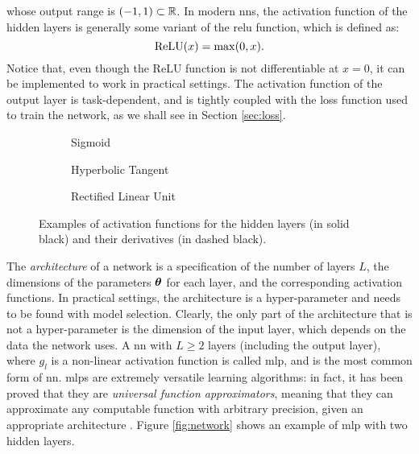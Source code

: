 whose output range is $(-1, 1) \subset \mathbb{R}$. In modern \glspl{nn}, the activation function of the hidden layers is generally some variant of the \gls{relu} function, which is defined as:
$$\mathrm{ReLU}(x) = \max(0, x).$$
Notice that, even though the ReLU function is not differentiable at $x = 0$, it can be implemented to work in practical settings.
The activation function of the output layer is task-dependent, and is tightly
coupled with the loss function used to train the network, as we shall see in
Section \ref{sec:loss}.
\begin{figure*}[h!]
    \begin{subfigure}[b]{0.32\linewidth}
        \centering
        \resizebox{.8\textwidth}{!}{}
        \caption{Sigmoid}
        \label{fig:sigmoid}
    \end{subfigure}
    \begin{subfigure}[b]{0.32\linewidth}
        \centering
        \resizebox{.8\textwidth}{!}{}
        \caption{Hyperbolic Tangent}
        \label{fig:hyptan}
    \end{subfigure}
    \begin{subfigure}[b]{0.32\linewidth}
        \centering
        \resizebox{.8\textwidth}{!}{}
        \caption{Rectified Linear Unit}
        \label{fig:relu}
    \end{subfigure}
    \caption{Examples of activation functions for the hidden layers (in solid black) and their derivatives (in dashed black).}
    \label{fig:activations}
\end{figure*}
The \emph{architecture} of a network is a specification of the number of layers
$L$, the dimensions of the parameters $\boldsymbol{\theta}$ for each layer, and the
corresponding activation functions. In practical settings, the architecture is a hyper-parameter and needs to be found with model selection. Clearly, the only part of the architecture that is not a hyper-parameter is the dimension of the input layer, which depends on the data the network uses. A \gls{nn} with $L \geq 2$ layers (including the output layer), where $g_{l}$ is a non-linear activation function is called \gls{mlp}, and is the most common form of \gls{nn}.
\glspl{mlp} are extremely versatile learning algorithms: in fact, it has been proved that they are \emph{universal function approximators}, meaning that they can approximate any computable function with arbitrary precision, given an appropriate architecture \cite{?}. Figure \ref{fig:network} shows an example of \gls{mlp} with two hidden layers.

